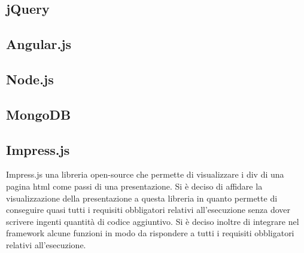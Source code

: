 	\subsection{jQuery}{
	}
	\subsection{Angular.js}{
	}
	\subsection{Node.js}{
	}
	\subsection{MongoDB}{
	}
	\subsection{Impress.js}{
		Impress.js una libreria open-source che permette di visualizzare i div di una pagina html come passi di una presentazione. Si è deciso di affidare la visualizzazione della presentazione a questa libreria in quanto permette di conseguire quasi tutti i requisiti obbligatori relativi all’esecuzione senza dover scrivere ingenti quantità di codice aggiuntivo.
		Si è deciso inoltre di integrare nel framework alcune funzioni in modo da rispondere a tutti i requisiti obbligatori relativi all’esecuzione.
	}